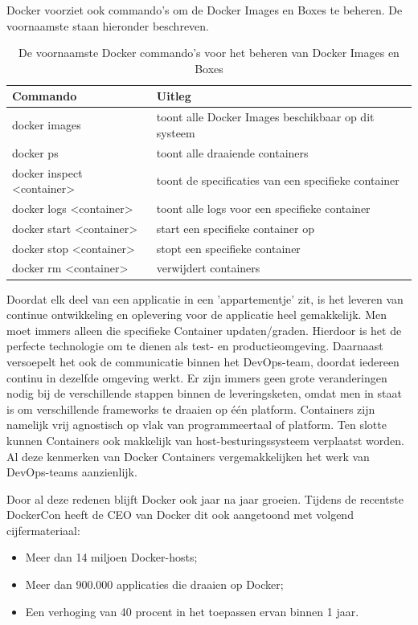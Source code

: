 Docker voorziet ook commando's om de Docker Images en Boxes te beheren. De voornaamste staan hieronder beschreven.
\begin{table}
	\begin{tabular}{ll}
		\hline
		Commando & Uitleg \\
		\hline
		docker images & toont alle Docker Images beschikbaar op dit systeem \\
		docker ps & toont alle draaiende containers \\
		docker inspect <container> & toont de specificaties van een specifieke container \\
		docker logs <container> & toont alle logs voor een specifieke container \\
		docker start <container> & start een specifieke container op \\
		docker stop <container> & stopt een specifieke container \\
		docker rm <container> & verwijdert containers \\
		\hline
	\end{tabular}
	\caption{De voornaamste Docker commando's voor het beheren van Docker Images en Boxes}
	\label{tab:dockercommandos}
\end{table}

\autocite{Grubor2017}

Doordat elk deel van een applicatie in een 'appartementje' zit, is het leveren van continue ontwikkeling en oplevering voor de applicatie heel gemakkelijk. Men moet immers alleen die specifieke Container updaten/graden. Hierdoor is het de perfecte technologie om te dienen als test- en productieomgeving. Daarnaast versoepelt het ook de communicatie binnen het DevOps-team, doordat iedereen continu in dezelfde omgeving werkt. Er zijn immers geen grote veranderingen nodig bij de verschillende stappen binnen de leveringsketen, omdat men in staat is om verschillende frameworks te draaien op één platform. Containers zijn namelijk vrij agnostisch op vlak van programmeertaal of platform. Ten slotte kunnen Containers ook makkelijk van host-besturingssysteem verplaatst worden. Al deze kenmerken van Docker Containers vergemakkelijken het werk van DevOps-teams aanzienlijk. \autocite{Mike2016}

Door al deze redenen blijft Docker ook jaar na jaar groeien. Tijdens de recentste DockerCon heeft de CEO van Docker dit ook aangetoond met volgend cijfermateriaal:

\begin{itemize}[noitemsep]
	\item Meer dan 14 miljoen Docker-hosts;
	\item Meer dan 900.000 applicaties die draaien op Docker;
	\item Een verhoging van 40 procent in het toepassen ervan binnen 1 jaar.
\end{itemize}

